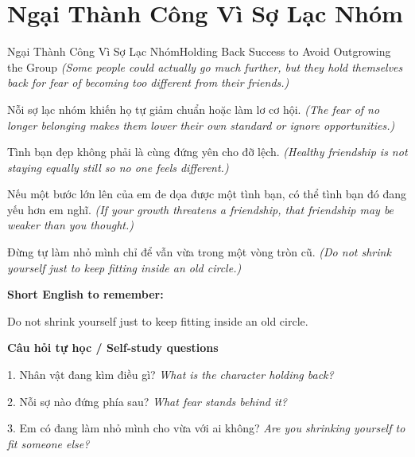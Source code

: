 \section{Ngại Thành Công Vì Sợ Lạc Nhóm}
\begin{truyen}{Ngại Thành Công Vì Sợ Lạc Nhóm}{Holding Back Success to Avoid Outgrowing the Group}
\textit{(Some people could actually go much further, but they hold themselves back for fear of becoming too different from their friends.)}

Nỗi sợ lạc nhóm khiến họ tự giảm chuẩn hoặc làm lơ cơ hội.
\textit{(The fear of no longer belonging makes them lower their own standard or ignore opportunities.)}

Tình bạn đẹp không phải là cùng đứng yên cho đỡ lệch.
\textit{(Healthy friendship is not staying equally still so no one feels different.)}

Nếu một bước lớn lên của em đe dọa được một tình bạn, có thể tình bạn đó đang yếu hơn em nghĩ.
\textit{(If your growth threatens a friendship, that friendship may be weaker than you thought.)}

\end{truyen}

\begin{baihoc}
Đừng tự làm nhỏ mình chỉ để vẫn vừa trong một vòng tròn cũ.
\textit{(Do not shrink yourself just to keep fitting inside an old circle.)}
\end{baihoc}

\begin{ghinhoanh}
\textbf{Short English to remember:}

Do not shrink yourself just to keep fitting inside an old circle.

\end{ghinhoanh}

\begin{tuhocnhanh}
\textbf{Câu hỏi tự học / Self-study questions}

1. Nhân vật đang kìm điều gì? \textit{What is the character holding back?}

2. Nỗi sợ nào đứng phía sau? \textit{What fear stands behind it?}

3. Em có đang làm nhỏ mình cho vừa với ai không? \textit{Are you shrinking yourself to fit someone else?}
\end{tuhocnhanh}
\ngancach

